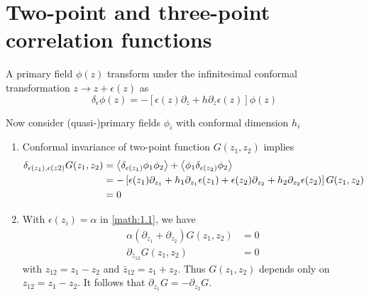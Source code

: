 \section{Two-point and three-point correlation functions}
A primary field $\phi(z)$ transform under the infinitesimal conformal transformation $z \rightarrow z + \epsilon(z)$ as 
\begin{equation}
	\delta_\epsilon \phi(z) = - \left[ \epsilon(z)\partial_z + h \partial_z \epsilon(z) \right] \phi(z)
\end{equation}

Now consider (quasi-)primary fields $\phi_i$ with conformal dimension $h_i$
\begin{enumerate}
	\item Conformal invariance of two-point function $G(z_1,z_2)$ implies
		\begin{align}
			\begin{split}
			\delta_{\epsilon(z_1),\epsilon(z2)} G(z_1, z_2) &= \expval{\delta_{\epsilon(z_1)}\phi_1 \phi_2} + \expval{\phi_1 \delta_{\epsilon(z_2)}\phi_2} \\
																			&= - \left[ \epsilon(z_1)\partial_{z_1} + h_1 \partial_{z_1} \epsilon(z_1) +  \epsilon(z_2)\partial_{z_2} + h_2 \partial_{z_2} \epsilon(z_2)\right] G(z_1, z_2) \\
																			&= 0
		\end{split}\label{math:1.1}
		\end{align}

	\item With $\epsilon(z_i)=\alpha$ in \eqref{math:1.1}, we have
		\begin{align*}
			\alpha\left( \partial_{z_1} + \partial_{z_2} \right) G(z_1, z_2) &= 0 \\
			\partial_{\bar{z}_{12}} G(z_1,z_2) &= 0
		\end{align*}
		with $z_{12} = z_1 - z_2$ and $\bar{z}_{12} = z_1 + z_2$. Thus $G(z_1, z_2)$ depends only on $z_{12} = z_1 - z_2$. It follows that $\partial_{z_1} G = - \partial_{z_2} G$.


\end{enumerate}
